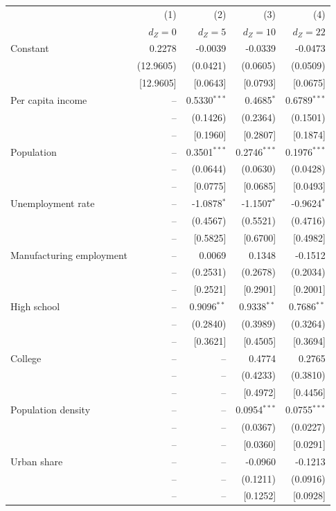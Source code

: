 \begin{tabular}{lrrrr}
\toprule
& (1) & (2) & (3) & (4) \\
& $d_Z = 0$ & $d_Z = 5$ & $d_Z = 10$ & $d_Z = 22$ \\
\midrule
Constant & 0.2278 & -0.0039 & -0.0339 & -0.0473 \\
 & (12.9605) & (0.0421) & (0.0605) & (0.0509) \\
 & [12.9605] & [0.0643] & [0.0793] & [0.0675] \\
Per capita income & -- & 0.5330$^{***}$ & 0.4685$^{*}$ & 0.6789$^{***}$ \\
 & -- & (0.1426) & (0.2364) & (0.1501) \\
 & -- & [0.1960] & [0.2807] & [0.1874] \\
Population & -- & 0.3501$^{***}$ & 0.2746$^{***}$ & 0.1976$^{***}$ \\
 & -- & (0.0644) & (0.0630) & (0.0428) \\
 & -- & [0.0775] & [0.0685] & [0.0493] \\
Unemployment rate & -- & -1.0878$^{*}$ & -1.1507$^{*}$ & -0.9624$^{*}$ \\
 & -- & (0.4567) & (0.5521) & (0.4716) \\
 & -- & [0.5825] & [0.6700] & [0.4982] \\
Manufacturing employment & -- & 0.0069 & 0.1348 & -0.1512 \\
 & -- & (0.2531) & (0.2678) & (0.2034) \\
 & -- & [0.2521] & [0.2901] & [0.2001] \\
High school & -- & 0.9096$^{**}$ & 0.9338$^{**}$ & 0.7686$^{**}$ \\
 & -- & (0.2840) & (0.3989) & (0.3264) \\
 & -- & [0.3621] & [0.4505] & [0.3694] \\
College & -- & -- & 0.4774 & 0.2765 \\
 & -- & -- & (0.4233) & (0.3810) \\
 & -- & -- & [0.4972] & [0.4456] \\
Population density & -- & -- & 0.0954$^{***}$ & 0.0755$^{***}$ \\
 & -- & -- & (0.0367) & (0.0227) \\
 & -- & -- & [0.0360] & [0.0291] \\
Urban share & -- & -- & -0.0960 & -0.1213 \\
 & -- & -- & (0.1211) & (0.0916) \\
 & -- & -- & [0.1252] & [0.0928] \\

\end{tabular}
